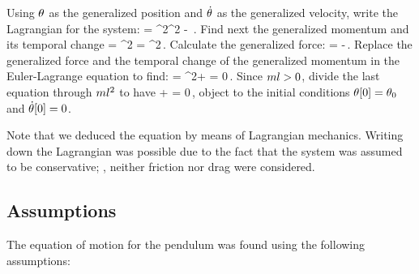 Using $\theta$ as the generalized position and $\dot{\theta}$ as the generalized velocity, write the Lagrangian for the system:
\beq
\lag = \mass\length^2\angvel^2 - \mass\grav\length\cos\vat{\angpos}\,.
\eeq
Find next the generalized momentum and its temporal change
\beq
\ipd{\angvel}{\lag} = \mass\length^2\angvel\implies
{}\ipd{\angvel}{\lag} = \mass\length^2\angacc\,.
\eeq
Calculate the generalized force:
\beq
\ipd{\angpos}{\lag} = -\mass\grav\length\sin\vat\angpos\,.
\eeq
Replace the generalized force and the temporal change of the generalized momentum in the Euler-Lagrange equation to find:
\beq
\elop{\angpos}{\angvel}\lag = \mass\length^2\angacc + \mass\grav\length\sin\vat\angpos = 0\,.
\eeq
Since $ml > 0$, divide the last equation through $ml^2$ to have
\beq
\angacc + \dfrac{\grav}{\length}\sin\vat\angpos = 0\,,
\eeq
object to the initial conditions $\theta\!\left[{0}\right] = \theta_0$ and $\dot{\theta}\!\left[{0}\right] = 0$.

Note that we deduced the equation by means of Lagrangian mechanics. Writing down the Lagrangian was possible due to the fact that the system was assumed to be conservative; \ie, neither friction nor drag were considered.


\subsection{Assumptions}
The equation of motion for the pendulum was found using the following assumptions:
